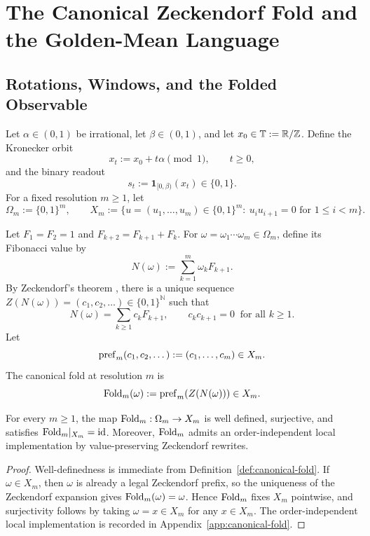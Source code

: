 \section{The Canonical Zeckendorf Fold and the Golden-Mean Language}
\label{sec:fold-language}

\subsection{Rotations, Windows, and the Folded Observable}

Let $\alpha\in(0,1)$ be irrational, let $\beta\in(0,1)$, and let
$x_0\in\mathbb{T}:=\mathbb{R}/\mathbb{Z}$.  Define the Kronecker orbit
\[
x_t:=x_0+t\alpha \pmod 1,\qquad t\ge 0,
\]
and the binary readout
\[
s_t:=\mathbf{1}_{[0,\beta)}(x_t)\in\{0,1\}.
\]
For a fixed resolution $m\ge 1$, let
\[
\Omega_m:=\{0,1\}^m,\qquad
X_m:=\{u=(u_1,\dots,u_m)\in\{0,1\}^m:\ u_i u_{i+1}=0\text{ for }1\le i<m\}.
\]

\begin{definition}\label{def:canonical-fold}
Let \(F_1=F_2=1\) and \(F_{k+2}=F_{k+1}+F_k\). For
\(\omega=\omega_1\cdots\omega_m\in\Omega_m\), define its Fibonacci value by
\[
N(\omega):=\sum_{k=1}^m \omega_k F_{k+1}.
\]
By Zeckendorf's theorem \cite{Zeckendorf1972}, there is a unique sequence
\(Z(N(\omega))=(c_1,c_2,\dots)\in\{0,1\}^{\mathbb{N}}\) such that
\[
N(\omega)=\sum_{k\ge 1} c_k F_{k+1},
\qquad
c_kc_{k+1}=0\ \text{ for all }k\ge 1.
\]
Let
\[
\mathrm{pref}_m(c_1,c_2,\dots):=(c_1,\dots,c_m)\in X_m.
\]
The canonical fold at resolution \(m\) is
\[
\mathrm{Fold}_m(\omega):=\mathrm{pref}_m(Z(N(\omega)))\in X_m.
\]
\end{definition}

\begin{proposition}\label{prop:canonical-fold-basic}
For every \(m\ge 1\), the map \(\mathrm{Fold}_m:\Omega_m\to X_m\) is well defined,
surjective, and satisfies \(\mathrm{Fold}_m|_{X_m}=\mathrm{id}\). Moreover,
\(\mathrm{Fold}_m\) admits an order-independent local implementation by
value-preserving Zeckendorf rewrites.
\end{proposition}

\begin{proof}
Well-definedness is immediate from Definition~\ref{def:canonical-fold}. If
\(\omega\in X_m\), then \(\omega\) is already a legal Zeckendorf prefix, so the
uniqueness of the Zeckendorf expansion gives \(\mathrm{Fold}_m(\omega)=\omega\). Hence
\(\mathrm{Fold}_m\) fixes \(X_m\) pointwise, and surjectivity follows by taking
\(\omega=x\in X_m\) for any \(x\in X_m\). The order-independent local
implementation is recorded in Appendix~\ref{app:canonical-fold}.
\end{proof}

